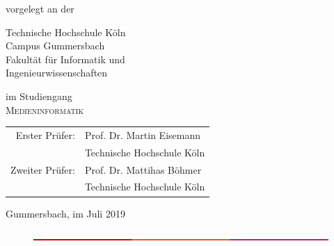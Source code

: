 \begin{titlepage}
\begin{center}
\vspace{1.0cm}



\begin{large}
vorgelegt an der\\ 
\vspace{0.2cm}
\begin{scshape}
Technische Hochschule Köln\\
Campus Gummersbach\\
Fakultät für Informatik und\\
Ingenieurwissenschaften\\
\end{scshape}
\end{large}

\vspace{0.4cm}

\begin{large}
im Studiengang\\ 
\vspace{0.2cm}
\textsc{Medieninformatik}
\end{large}


\vspace{1.0cm}

\begin{tabular}{rl}
        Erster Prüfer:  &  Prof. Dr. Martin Eisemann\\
       					&  \small Technische Hochschule Köln \\[1.0em]
       Zweiter Prüfer:  &  Prof. Dr. Mattihas Böhmer\\
       					&  \small Technische Hochschule Köln\\
\end{tabular}

\vspace{0.8cm}

\begin{large}
Gummersbach, im Juli 2019
\end{large}
\vspace{\distance}
\end{center}
\begin{figure}[!ht]
		\includegraphics[width=\textwidth]{images/balken.png}
\end{figure}


\end{titlepage}
